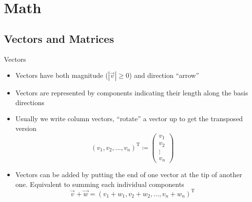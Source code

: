 

\subtitle{Part I -- Math and Minimizers}


  \maketitle

  \section{Math}

  \subsection{Vectors and Matrices}

  \begin{frame}{Vectors}
    \begin{itemize}
      \item Vectors have both magnitude ($|\vec{v}| \geq 0$) and direction
        \rightarrow \enquote{arrow}
      \item Vectors are represented by components indicating their length
        along the basis directions
      \item Usually we write column vectors,
        \enquote{rotate} a vector up to get the transposed version
        \begin{equation*}
          \left(v_1, v_2, \dots, v_n\right)^\mathrm{T} \coloneqq
          \begin{pmatrix} v_1 \\ v_2 \\ \vdots \\ v_n \end{pmatrix}
        \end{equation*}
      \item Vectors can be added by putting the end of one vector at the tip
        of another one. Equivalent to summing each individual components
        \begin{equation*}
          \vec{v} + \vec{w} =
            \left(v_1 + w_1, v_2 + w_2, \dots, v_n + w_n\right)^\mathrm{T}
        \end{equation*}
    \end{itemize}
  \end{frame}

